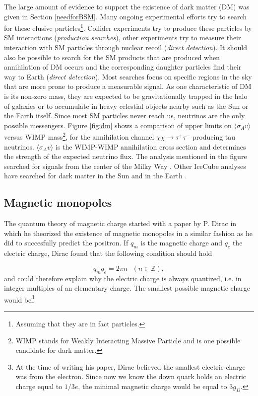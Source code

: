 The large amount of evidence to support the existence of dark matter (DM) was given in Section \ref{needforBSM}. Many ongoing experimental efforts try to search for these elusive particles\footnote{Assuming that they are in fact particles.}. Collider experiments try to produce these particles by SM interactions (\textit{production searches}), other experiments try to measure their interaction with SM particles through nuclear recoil (\textit{direct detection}). It should also be possible to search for the SM products that are produced when annihilation of DM occurs and the corresponding daughter particles find their way to Earth (\textit{direct detection}). Most searches focus on specific regions in the sky that are more prone to produce a measurable signal. As one characteristic of DM is its non-zero mass, they are expected to be gravitationally trapped in the halo of galaxies or to accumulate in heavy celestial objects nearby such as the Sun or the Earth itself. Since most SM particles never reach us, neutrinos are the only possible messengers. Figure \ref{fig:dm} shows a comparison of upper limits on $\langle \sigma_A v\rangle$ versus WIMP mass\footnote{WIMP stands for Weakly Interacting Massive Particle and is one possible candidate for dark matter.}, for the annihilation channel $\chi \chi \rightarrow \tau^+ \tau^-$ producing tau neutrinos. $\langle \sigma_A v\rangle$ is the WIMP-WIMP annihilation cross section and determines the strength of the expected neutrino flux. The analysis mentioned in the figure searched for signals from the center of the Milky Way \cite{Aartsen:2017ulx}. Other IceCube analyses have searched for dark matter in the Sun \cite{Aartsen:2016zhm,Abbasi:2009vg} and in the Earth \cite{Aartsen:2016fep}.

\subsection{Magnetic monopoles}
The quantum theory of magnetic charge started with a paper by P. Dirac \cite{Dirac60} in which he theorized the existence of magnetic monopoles in a similar fashion as he did to succesfully predict the positron. If $q_m$ is the magnetic charge and $q_e$ the electric charge, Dirac found that the following condition should hold

\begin{equation}
q_m q_e = 2\pi n \ \ \ (n \in \mathbb{Z}),
\end{equation}
and could therefore explain why the electric charge is always quantized, i.e. in integer multiples of an elementary charge. The smallest possible magnetic charge  would be\footnote{At the time of writing his paper, Dirac believed the smallest electric charge was from the electron. Since now we know the down quark holds an electric charge equal to $1/3 e$, the minimal magnetic charge would be equal to $3g_D$.} 

